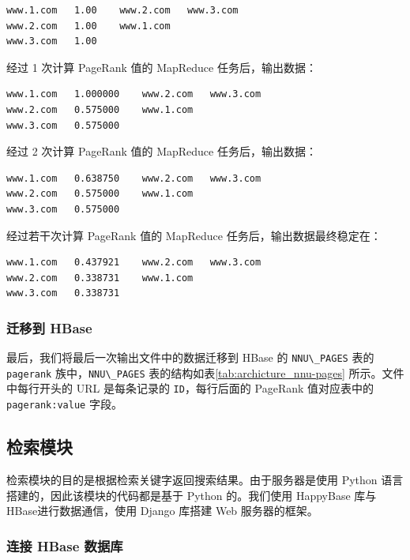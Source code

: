 \documentclass{ctexart}
\newcommand{\code}[1]{\colorbox{backcolor}{\lstinline|#1|}}
\begin{document}
    \begin{lstlisting}
www.1.com	1.00	www.2.com	www.3.com
www.2.com	1.00	www.1.com
www.3.com	1.00
    \end{lstlisting}

    经过 1 次计算 PageRank 值的 MapReduce 任务后，输出数据：

    \begin{lstlisting}
www.1.com	1.000000	www.2.com	www.3.com
www.2.com	0.575000	www.1.com
www.3.com	0.575000
    \end{lstlisting}

    经过 2 次计算 PageRank 值的 MapReduce 任务后，输出数据：

    \begin{lstlisting}
www.1.com	0.638750	www.2.com	www.3.com
www.2.com	0.575000	www.1.com
www.3.com	0.575000
    \end{lstlisting}

    经过若干次计算 PageRank 值的 MapReduce 任务后，输出数据最终稳定在：

    \begin{lstlisting}
www.1.com	0.437921	www.2.com	www.3.com
www.2.com	0.338731	www.1.com
www.3.com	0.338731
    \end{lstlisting}

    \subsubsection{迁移到 HBase}\label{subsubsec:pagerank_migrate}

    最后，我们将最后一次输出文件中的数据迁移到 HBase 的 \code{NNU\_PAGES} 表的 \code{pagerank} 族中，\code{NNU\_PAGES} 表的结构如表\ref{tab:archicture_nnu-pages} 所示。文件中每行开头的 URL 是每条记录的 \code{ID}，每行后面的 PageRank 值对应表中的 \code{pagerank:value} 字段。

    \subsection{检索模块}\label{subsec:retrieve}

    检索模块的目的是根据检索关键字返回搜索结果。由于服务器是使用 Python 语言搭建的，因此该模块的代码都是基于 Python 的。我们使用 HappyBase 库\cite{docs-happybase}与 HBase进行数据通信，使用 Django 库\cite{docs-django}搭建 Web 服务器的框架。

    \subsubsection{连接 HBase 数据库}\label{subsubsec:retrieve_connect}
\end{document}
